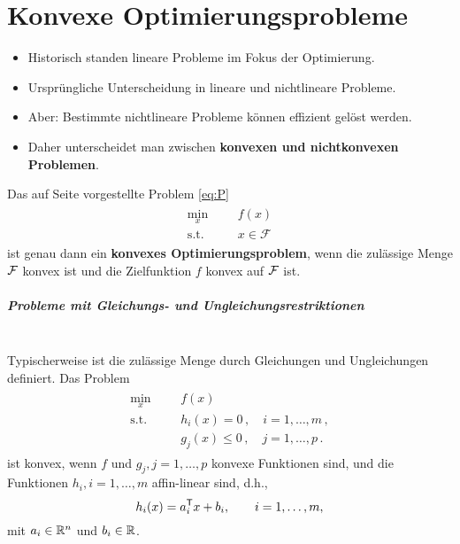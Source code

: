 \chapter{Konvexe Optimierungsprobleme}

\begin{itemize}
\item Historisch standen lineare Probleme im Fokus der Optimierung.
\item Urspr\"ungliche Unterscheidung in lineare und nichtlineare Probleme.
\item  Aber: Bestimmte nichtlineare Probleme k\"onnen effizient gel\"ost werden.
\item  Daher unterscheidet man zwischen \textbf{konvexen und nichtkonvexen Problemen}.
\end{itemize}
Das auf Seite \pageref{eq:P} vorgestellte Problem \eqref{eq:P}
\begin{gather}
\tag{P}
\begin{aligned}
\min_x
& & & f(x) \\
\text{s.t.}
& & & x\in \mathcal{F}
\end{aligned}
\end{gather}
ist genau dann ein \textbf{konvexes Optimierungsproblem}, wenn die zul\"assige Menge $\mathcal{F}$ konvex ist und die Zielfunktion $f$ konvex auf $\mathcal{F}$ ist.

\paragraph{Probleme mit Gleichungs- und Ungleichungsrestriktionen}~\\

Typischerweise ist die zul\"assige Menge durch Gleichungen und Ungleichungen definiert.
Das Problem
 \begin{gather}
   \label{eq:QP}   
   \tag{QP}
   \begin{aligned}
     \min_x
     & & & f(x) \\
     \text{s.t.}
     & & & h_i(x) = 0\,, \quad i = 1,\ldots,m\,,\\
     & & & g_j(x) \leq 0\,, \quad j = 1,\ldots,p\,.
   \end{aligned}
 \end{gather}
ist konvex, wenn $f$ und $g_j,j=1,\dots,p$ konvexe Funktionen sind, und die Funktionen $h_i,i=1,\dots,m$ affin-linear sind, d.h.,
\begin{equation*}
	h_i(x)=a_i^\mathsf{T} x+b_i,\qquad i=1,\dots,m,
\end{equation*}
mit $a_i\in\mathbb R^n$ und $b_i\in\mathbb R$.

